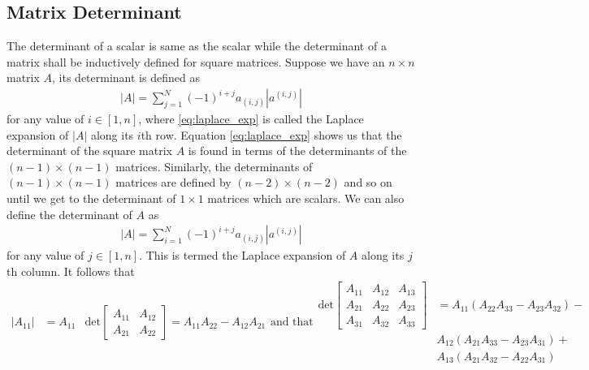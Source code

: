 \subsection{Matrix Determinant}
%
The determinant of a scalar is same as the scalar while the determinant of a matrix shall be inductively defined for square matrices. Suppose we have an $n \times n$ matrix $A$, its determinant is defined as 
%
\begin{align}
	|A| = \sum_{j=1}^N (-1)^{i+j} a_{(i,j)} | a^{(i,j)} |
	\label{eq:laplace_exp}
\end{align}
%
for any value of $i \in [1, n]$, where \eqref{eq:laplace_exp} is called the Laplace expansion of $|A|$ along its $i$th row. Equation \eqref{eq:laplace_exp} shows us that the determinant of the square matrix $A$ is found in terms of the determinants of the $(n-1) \times (n-1)$ matrices. Similarly, the determinants of $(n-1) \times (n-1)$ matrices are defined by $(n-2) \times (n-2)$ and so on until we get to the determinant of $1\times1$ matrices which are scalars. We can also define the determinant of $A$ as 
%
\begin{align}
	 |A| = \sum_{i=1}^N(-1)^{i+j} a_{(i,j)} |a^{(i,j)}|
\end{align}
%
for any value of $j \in [1, n]$. This is termed the Laplace expansion of $A$ along its $j$th column. It follows that 
%
\begin{subequations}
	\begin{align}
	   |A_{11}| &= A_{11} 
	\end{align}
	\begin{align}
	\text{det} \begin{bmatrix}
	A_{11} & A_{12} \\
	A_{21} & A_{22}
	\end{bmatrix} = A_{11} A_{22} - A_{12}A_{21}
	\end{align}
	\text{and that}
	\begin{align}
	\text{det} \begin{bmatrix}
	A_{11} & A_{12} & A_{13} \\
	A_{21} & A_{22} & A_{23} \\
	A_{31} & A_{32} & A_{33} 
	\end{bmatrix} &= A_{11} (A_{22} A_{33}- A_{23}A_{32}) - \\
						  & A_{12} (A_{21} A_{33}- A_{23}A_{31}) + \\
						  & A_{13} (A_{21} A_{32}- A_{22}A_{31}) \
	\end{align}
\end{subequations}

